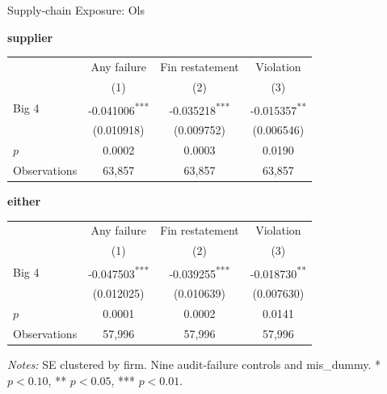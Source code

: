 \documentclass[10pt]{article}
\newcommand{\sym}[1]{\textsuperscript{#1}}
\begin{document}
\fontsize{10}{12}\selectfont
\setlength{\tabcolsep}{3pt}\renewcommand{\arraystretch}{1.15}
\begin{center}\large Supply-chain Exposure: Ols\end{center}
\medskip\textbf{supplier}\par\smallskip
\begin{tabular*}{\textwidth}{@{\extracolsep{\fill}}lccc@{}}
\toprule
 & Any failure & Fin restatement & Violation \\
 & (1) & (2) & (3) \\
\midrule
Big 4 & -0.041006\sym{***} & -0.035218\sym{***} & -0.015357\sym{**} \\
 & (0.010918) & (0.009752) & (0.006546) \\
$p$ & 0.0002 & 0.0003 & 0.0190 \\
Observations & 63,857 & 63,857 & 63,857 \\
\bottomrule\end{tabular*}\par
\medskip\textbf{either}\par\smallskip
\begin{tabular*}{\textwidth}{@{\extracolsep{\fill}}lccc@{}}
\toprule
 & Any failure & Fin restatement & Violation \\
 & (1) & (2) & (3) \\
\midrule
Big 4 & -0.047503\sym{***} & -0.039255\sym{***} & -0.018730\sym{**} \\
 & (0.012025) & (0.010639) & (0.007630) \\
$p$ & 0.0001 & 0.0002 & 0.0141 \\
Observations & 57,996 & 57,996 & 57,996 \\
\bottomrule\end{tabular*}\par
\medskip\fontsize{9}{11}\selectfont\textit{Notes:} SE clustered by firm. Nine audit-failure controls and mis\_dummy. * $p<0.10$, ** $p<0.05$, *** $p<0.01$.
\end{document}
